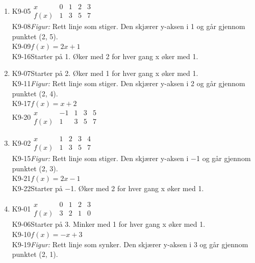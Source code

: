 \documentclass[11pt,a4paper]{article}
\begin{document}
\begin{enumerate}[leftmargin=1.6em, itemsep=0.7em]
\item \begin{minipage}[t]{\linewidth}\textsf{\small K9-05}\quad $\begin{array}{c|cccc} x & 0 & 1 & 2 & 3 \\ \hline f(x) & 1 & 3 & 5 & 7 \end{array}$ \\ \textsf{\small K9-08}\quad \emph{Figur:} Rett linje som stiger. Den skjærer y-aksen i 1 og går gjennom punktet (2, 5). \\ \textsf{\small K9-09}\quad $f(x) = 2x + 1$ \\ \textsf{\small K9-16}\quad Starter på 1. Øker med 2 for hver gang x øker med 1.\end{minipage}
\item \begin{minipage}[t]{\linewidth}\textsf{\small K9-07}\quad Starter på 2. Øker med 1 for hver gang x øker med 1. \\ \textsf{\small K9-11}\quad \emph{Figur:} Rett linje som stiger. Den skjærer y-aksen i 2 og går gjennom punktet (2, 4). \\ \textsf{\small K9-17}\quad $f(x) = x + 2$ \\ \textsf{\small K9-20}\quad $\begin{array}{c|cccc} x & -1 & 1 & 3 & 5 \\ \hline f(x) & 1 & 3 & 5 & 7 \end{array}$\end{minipage}
\item \begin{minipage}[t]{\linewidth}\textsf{\small K9-02}\quad $\begin{array}{c|cccc} x & 1 & 2 & 3 & 4 \\ \hline f(x) & 1 & 3 & 5 & 7 \end{array}$ \\ \textsf{\small K9-15}\quad \emph{Figur:} Rett linje som stiger. Den skjærer y-aksen i −1 og går gjennom punktet (2, 3). \\ \textsf{\small K9-21}\quad $f(x) = 2x - 1$ \\ \textsf{\small K9-22}\quad Starter på −1. Øker med 2 for hver gang x øker med 1.\end{minipage}
\item \begin{minipage}[t]{\linewidth}\textsf{\small K9-01}\quad $\begin{array}{c|cccc} x & 0 & 1 & 2 & 3 \\ \hline f(x) & 3 & 2 & 1 & 0 \end{array}$ \\ \textsf{\small K9-06}\quad Starter på 3. Minker med 1 for hver gang x øker med 1. \\ \textsf{\small K9-10}\quad $f(x) = -x + 3$ \\ \textsf{\small K9-19}\quad \emph{Figur:} Rett linje som synker. Den skjærer y-aksen i 3 og går gjennom punktet (2, 1).\end{minipage}

\end{enumerate}
\end{document}

